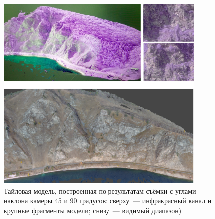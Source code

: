 \begin{figure}[h!]
  \begin{center}
    \includegraphics[width=0.9\textwidth]{authors/efremov-fig3.jpg}
  \end{center}
  \caption{Тайловая модель, построенная по результатам съёмки с углами наклона камеры 45 и 90 градусов: сверху~--- инфракрасный канал и крупные фрагменты модели; снизу~--- видимый диапазон)}
  \label{fig:efremov-fig3}
\end{figure}
